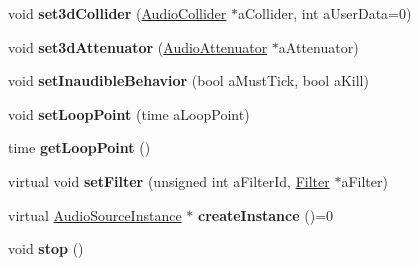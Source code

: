\begin{DoxyCompactItemize}
void {\bfseries set3d\+Collider} (\mbox{\hyperlink{class_so_loud_1_1_audio_collider}{Audio\+Collider}} $\ast$a\+Collider, int a\+User\+Data=0)
\item 
\mbox{\label{class_so_loud_1_1_audio_source_a39a7ea2b96454986488ce09d4f7f3ff0}} 
void {\bfseries set3d\+Attenuator} (\mbox{\hyperlink{class_so_loud_1_1_audio_attenuator}{Audio\+Attenuator}} $\ast$a\+Attenuator)
\item 
\mbox{\label{class_so_loud_1_1_audio_source_a692f6985ec2451e6f005e95370e8fd66}} 
void {\bfseries set\+Inaudible\+Behavior} (bool a\+Must\+Tick, bool a\+Kill)
\item 
\mbox{\label{class_so_loud_1_1_audio_source_a148f829d9a298b3f3997a3426cab6725}} 
void {\bfseries set\+Loop\+Point} (time a\+Loop\+Point)
\item 
\mbox{\label{class_so_loud_1_1_audio_source_a870eec42c3322aafa41bd94579a50103}} 
time {\bfseries get\+Loop\+Point} ()
\item 
\mbox{\label{class_so_loud_1_1_audio_source_a41d4c8fd5fc6590527566b21fdbfbbdf}} 
virtual void {\bfseries set\+Filter} (unsigned int a\+Filter\+Id, \mbox{\hyperlink{class_so_loud_1_1_filter}{Filter}} $\ast$a\+Filter)
\item 
\mbox{\label{class_so_loud_1_1_audio_source_a998f467f3429af13fd0bcbe9f842ddbe}} 
virtual \mbox{\hyperlink{class_so_loud_1_1_audio_source_instance}{Audio\+Source\+Instance}} $\ast$ {\bfseries create\+Instance} ()=0
\item 
\mbox{\label{class_so_loud_1_1_audio_source_adf861c6b20ed4c2bd318befcd00b3e8b}} 
void {\bfseries stop} ()
\end{DoxyCompactItemize}
